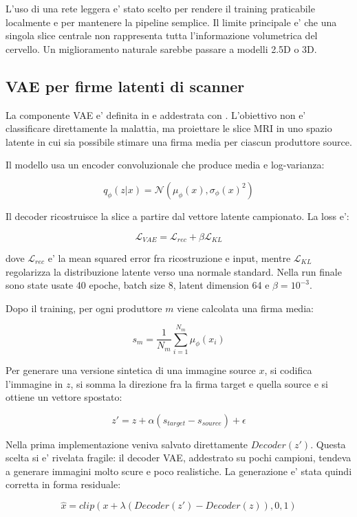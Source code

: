 \documentclass[12pt,a4paper]{article}
\begin{document}
L'uso di una rete leggera e' stato scelto per rendere il training praticabile localmente e per mantenere la pipeline semplice. Il limite principale e' che una singola slice centrale non rappresenta tutta l'informazione volumetrica del cervello. Un miglioramento naturale sarebbe passare a modelli 2.5D o 3D.

\subsection{VAE per firme latenti di scanner}

La componente VAE e' definita in  e addestrata con . L'obiettivo non e' classificare direttamente la malattia, ma proiettare le slice MRI in uno spazio latente in cui sia possibile stimare una firma media per ciascun produttore source.

Il modello usa un encoder convoluzionale che produce media e log-varianza:

\[
q_\phi(z|x) = \mathcal{N}(\mu_\phi(x), \sigma_\phi(x)^2)
\]

Il decoder ricostruisce la slice a partire dal vettore latente campionato. La loss e':

\[
\mathcal{L}_{VAE} = \mathcal{L}_{rec} + \beta \mathcal{L}_{KL}
\]

dove \(\mathcal{L}_{rec}\) e' la mean squared error fra ricostruzione e input, mentre \(\mathcal{L}_{KL}\) regolarizza la distribuzione latente verso una normale standard. Nella run finale sono state usate 40 epoche, batch size 8, latent dimension 64 e \(\beta = 10^{-3}\).

Dopo il training, per ogni produttore \(m\) viene calcolata una firma media:

\[
s_m = \frac{1}{N_m}\sum_{i=1}^{N_m}\mu_\phi(x_i)
\]

Per generare una versione sintetica di una immagine source \(x\), si codifica l'immagine in \(z\), si somma la direzione fra la firma target e quella source e si ottiene un vettore spostato:

\[
z' = z + \alpha(s_{target} - s_{source}) + \epsilon
\]

Nella prima implementazione veniva salvato direttamente \(Decoder(z')\). Questa scelta si e' rivelata fragile: il decoder VAE, addestrato su pochi campioni, tendeva a generare immagini molto scure e poco realistiche. La generazione e' stata quindi corretta in forma residuale:

\[
\hat{x} = clip(x + \lambda(Decoder(z') - Decoder(z)), 0, 1)
\]
\end{document}
